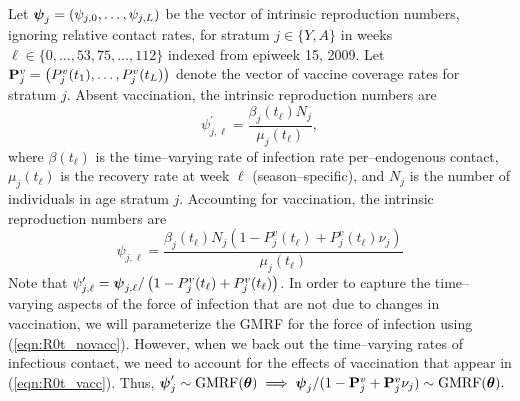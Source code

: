 Let $ \boldsymbol{\psi}_{j} = (\psi_{j,0},\dots,\psi_{j,L}) $ be the vector of intrinsic reproduction numbers, ignoring relative contact rates, for stratum $ j \in \lbrace Y,A \rbrace$ in weeks $ \ell \in \lbrace0,\dots,53,75,\dots,112\rbrace$ indexed from epiweek 15, 2009. Let $ \mathbf{P}^v_j = \left (P^v_j(t_1),\dots,P^v_j(t_L)\right )$ denote the vector of vaccine coverage rates for stratum $ j $. Absent vaccination, the intrinsic reproduction numbers are 
\begin{equation}
\label{eqn:R0t_novacc}
\psi^\prime_{j,\ell} = \frac{\beta_j(t_\ell)N_j}{\mu_j(t_\ell)},
\end{equation}
where $ \beta(t_\ell) $ is the time--varying rate of infection rate per--endogenous contact, $ \mu_j(t_\ell) $ is the recovery rate at week $ \ell $ (season--specific), and $ N_{j} $ is the number of individuals in age stratum $ j $. Accounting for vaccination, the intrinsic reproduction numbers are
\begin{equation}
\label{eqn:R0t_vacc}
\psi_{j,\ell} = \frac{\beta_j(t_\ell)N_j\left (1 - P^v_j(t_\ell) + P^v_j(t_\ell)\nu_j\right )}{\mu_j(t_\ell)}
\end{equation}
Note that $ \psi_{j,\ell}^\prime = \boldsymbol{\psi}_{j,\ell} / \left (1 - P^v_j(t_\ell) + P^v_j(t_\ell)\right ) $. In order to capture the time--varying aspects of the force of infection that are not due to changes in vaccination, we will parameterize the GMRF for the force of infection using (\ref{eqn:R0t_novacc}). However, when we back out the time--varying rates of infectious contact, we need to account for the effects of vaccination that appear in (\ref{eqn:R0t_vacc}). Thus, $ \boldsymbol{\psi}_j^\prime\sim \mathrm{GMRF}(\boldsymbol{\theta}) \implies\boldsymbol{\psi}_j / (1 - \mathbf{P}^v_j + \mathbf{P}^v_j\nu_j) \sim \mathrm{GMRF}(\boldsymbol{\theta}). $

